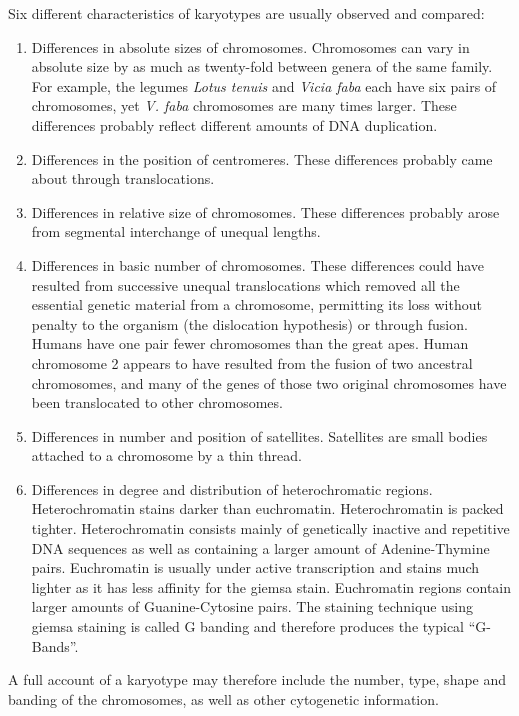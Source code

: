 \documentclass[]{book}
\providecommand{\tightlist}{%
  \setlength{\itemsep}{0pt}\setlength{\parskip}{0pt}}
\begin{document}
Six different characteristics of karyotypes are usually observed and compared:

\begin{enumerate}
\def\labelenumi{\arabic{enumi}.}
\tightlist
\item
  Differences in absolute sizes of chromosomes. Chromosomes can vary in absolute size by as much as twenty-fold between genera of the same family. For example, the legumes \emph{Lotus tenuis} and \emph{Vicia faba} each have six pairs of chromosomes, yet \emph{V. faba} chromosomes are many times larger. These differences probably reflect different amounts of DNA duplication.
\item
  Differences in the position of centromeres. These differences probably came about through translocations.
\item
  Differences in relative size of chromosomes. These differences probably arose from segmental interchange of unequal lengths.
\item
  Differences in basic number of chromosomes. These differences could have resulted from successive unequal translocations which removed all the essential genetic material from a chromosome, permitting its loss without penalty to the organism (the dislocation hypothesis) or through fusion. Humans have one pair fewer chromosomes than the great apes. Human chromosome 2 appears to have resulted from the fusion of two ancestral chromosomes, and many of the genes of those two original chromosomes have been translocated to other chromosomes.
\item
  Differences in number and position of satellites. Satellites are small bodies attached to a chromosome by a thin thread.
\item
  Differences in degree and distribution of heterochromatic regions. Heterochromatin stains darker than euchromatin. Heterochromatin is packed tighter. Heterochromatin consists mainly of genetically inactive and repetitive DNA sequences as well as containing a larger amount of Adenine-Thymine pairs. Euchromatin is usually under active transcription and stains much lighter as it has less affinity for the giemsa stain. Euchromatin regions contain larger amounts of Guanine-Cytosine pairs. The staining technique using giemsa staining is called G banding and therefore produces the typical ``G-Bands''.
\end{enumerate}

A full account of a karyotype may therefore include the number, type, shape and banding of the chromosomes, as well as other cytogenetic information.
\end{document}
